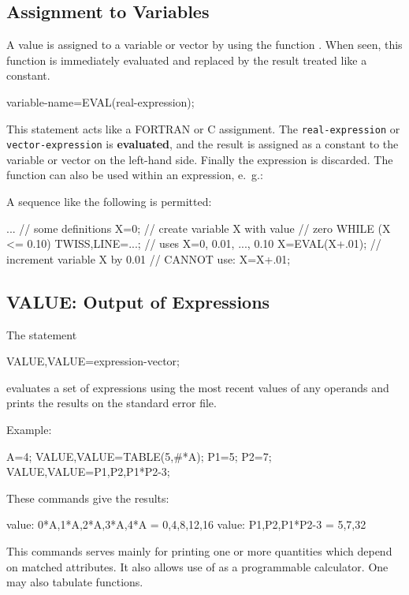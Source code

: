\subsection{Assignment to Variables}
\label{sec:eval}
A value is assigned to a variable or vector by using the function
.
When seen, this function is immediately evaluated and replaced by the
result treated like a constant.
\begin{example}
variable-name=EVAL(real-expression);
\end{example}
This statement acts like a FORTRAN or C assignment.
The \texttt{real-expression} or \texttt{vector-expression} is
\textbf{evaluated},
and the result is assigned as a constant to the variable or vector on
the left-hand side.
Finally the expression is discarded.
The  function can also be used within an expression, e.~g.:
\begin{example}
vector-name=TABLE(range,EVAL(real-expression));
vector-name={...,EVAL(real-expression),...);
\end{example}
A sequence like the following is permitted:
\begin{example}
...                 // some definitions
X=0;                // create variable X with value
                    // zero
WHILE (X <= 0.10) {
  TWISS,LINE=...;   // uses X=0, 0.01, ..., 0.10
  X=EVAL(X+.01);    // increment variable X by 0.01
                    // CANNOT use: X=X+.01;
}
\end{example}

\subsection{VALUE: Output of Expressions}
\label{sec:value}
The statement
\begin{example}
VALUE,VALUE=expression-vector;
\end{example}
evaluates a set of expressions using the most recent values of
any operands and prints the results on the standard error file.

\noindent Example:
\begin{example}
A=4;
VALUE,VALUE=TABLE(5,#*A);
P1=5;
P2=7;
VALUE,VALUE={P1,P2,P1*P2-3};
\end{example}
These commands give the results:
\begin{example}
value: {0*A,1*A,2*A,3*A,4*A} = {0,4,8,12,16}
value: {P1,P2,P1*P2-3} = {5,7,32}
\end{example}
This commands serves mainly for printing one or more quantities
which depend on matched attributes.
It also allows use of \opal as a programmable calculator.
One may also tabulate functions.


